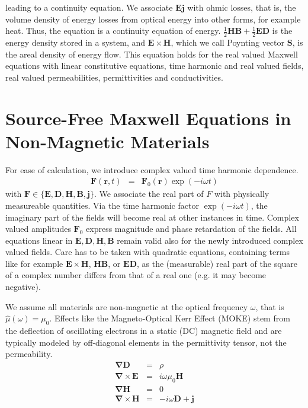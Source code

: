 \documentclass[12pt,a4paper,twoside,openright,BCOR10mm,headsepline,titlepage,abstracton,chapterprefix,final]{scrreprt}
\newcommand\Vector[1]{{\mathbf{#1}}}
\newcommand\vacuum{0}
\newcommand\Nabla{\Vector{\nabla}}
\newcommand\Tensor[1]{\hat{#1}}
\newcommand\scalarEfield{E}
\newcommand\scalarBfield{B}
\newcommand\scalarHfield{H}
\newcommand\scalarDfield{D}
\newcommand\Efield{\Vector{\scalarEfield}}
\newcommand\Bfield{\Vector{\scalarBfield}}
\newcommand\Hfield{\Vector{\scalarHfield}}
\newcommand\Dfield{\Vector{\scalarDfield}}
\newcommand\permeability{\Tensor{\mu}}
\newcommand\vacuumpermeability{\mu_{\vacuum}}
\newcommand\currentdensity{\Vector{j}}
\newcommand\chargedensity{\rho}
\begin{document}
leading to a continuity equation. 
We associate $\Efield \currentdensity$ with ohmic losses, that is, the volume density of energy losses from optical energy into other forms, for example heat.
Thus, the equation is a continuity equation of energy.
$\frac{1}{2} \Hfield \Bfield + \frac{1}{2} \Efield \Dfield$ is the energy density stored in a system, 
and $\Efield \times \Hfield$, which we call Poynting vector $\Vector{S}$, is the areal density of energy flow. 
This equation holds for the real valued Maxwell equations with linear constitutive equations, time harmonic and real valued fields, real valued permeabilities, permittivities and conductivities.

\section{Source-Free Maxwell Equations in Non-Magnetic Materials}
\label{sec:sourcefreemaxwell}
For ease of calculation, we introduce complex valued time harmonic dependence.
\begin{eqnarray}
 \Vector{F}(\Vector{r},t) &=& \Vector{F}_0(\Vector{r}) \exp(-i \omega t)
\end{eqnarray}
with $\Vector{F} \in \{ \Efield, \Dfield, \Hfield, \Bfield, \currentdensity \}$.
We associate the real part of $F$ with physically measureable quantities. 
Via the time harmonic factor $\exp(-i \omega t)$, the imaginary part of the fields will become real at other instances in time.
Complex valued amplitudes $\Vector{F}_0$ express magnitude and phase retardation of the fields.
All equations linear in $\Efield,\Dfield,\Hfield,\Bfield$ remain valid also for the newly introduced complex valued fields.
Care has to be taken with quadratic equations, containing terms like for example $\Efield \times \Hfield$, $\Hfield \Bfield$, or $\Efield \Dfield$,
as the (measurable) real part of the square of a complex number differs from that of a real one (e.g. it may become negative).

We assume all materials are non-magnetic at the optical frequency $\omega$, that is $\permeability(\omega) = \vacuumpermeability$. 
Effects like the Magneto-Optical Kerr Effect (MOKE) stem from the deflection of oscillating electrons in a static (DC) magnetic field and are typically modeled by off-diagonal elements in the permittivity tensor, not the permeability.
\begin{subequations}
\begin{eqnarray}
  \Nabla \Dfield &=& \chargedensity 					\\
  \Nabla \times \Efield &=& i \omega \vacuumpermeability \Hfield	\\
  \Nabla \Hfield &=& 0  					\\
  \Nabla \times \Hfield &=& - i \omega \Dfield + \currentdensity  		
\end{eqnarray}
\end{subequations}
\end{document}
